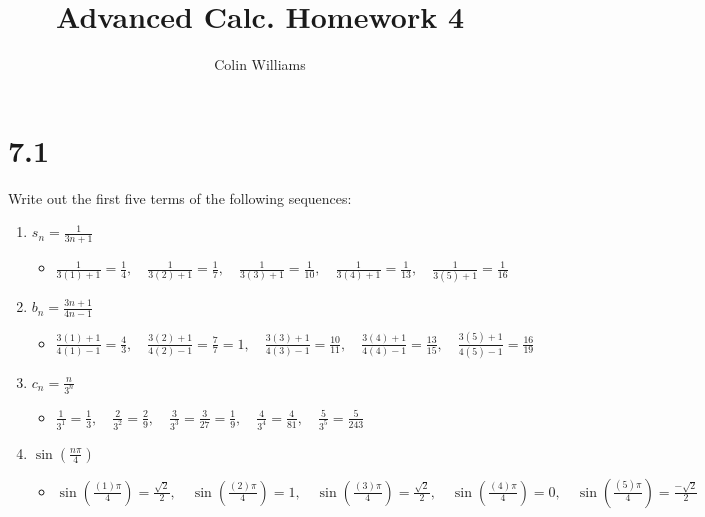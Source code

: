 \documentclass[10pt,a4paper]{article}
\title{Advanced Calc. Homework 4}
\author{Colin Williams}
\theoremstyle{definition}
\begin{document}
\maketitle

\section*{7.1}
Write out the first five terms of the following sequences:
\begin{enumerate}[label = (\alph*)]
\item $\displaystyle s_n = \frac{1}{3n + 1}$
	\begin{itemize}
	\item $\displaystyle \frac{1}{3(1) + 1} = \boxed{\frac{1}{4}}, \quad \frac{1}{3(2) + 1} = \boxed{\frac{1}{7}}, \quad \frac{1}{3(3) + 1} = \boxed{\frac{1}{10}}, \quad \frac{1}{3(4) + 1} = \boxed{\frac{1}{13}}, \quad \frac{1}{3(5) + 1} = \boxed{\frac{1}{16}}$
	\end{itemize}
\item $\displaystyle b_n = \frac{3n + 1}{4n - 1}$
	\begin{itemize}
	\item $\displaystyle \frac{3(1) + 1}{4(1) - 1} = \boxed{\frac{4}{3}}, \quad \frac{3(2) + 1}{4(2) - 1} = \frac{7}{7} = \boxed{1}, \quad \frac{3(3) + 1}{4(3) - 1} = \boxed{\frac{10}{11}}, \quad \frac{3(4) + 1}{4(4) - 1} = \boxed{\frac{13}{15}}, \quad \frac{3(5) + 1}{4(5) - 1} = \boxed{\frac{16}{19}}$
	\end{itemize}
\item $\displaystyle c_n = \frac{n}{3^n}$
	\begin{itemize}
	\item $\displaystyle \frac{1}{3^1} = \boxed{\frac{1}{3}}, \quad \frac{2}{3^2} = \boxed{\frac{2}{9}}, \quad \frac{3}{3^3} = \frac{3}{27} = \boxed{\frac{1}{9}}, \quad \frac{4}{3^4} = \boxed{\frac{4}{81}}, \quad \frac{5}{3^5} = \boxed{\frac{5}{243}}$
	\end{itemize}
\item $\displaystyle \sin\left(\frac{n \pi}{4}\right)$
	\begin{itemize}
	\item $\displaystyle \sin\left(\frac{(1) \pi}{4}\right) = \boxed{\frac{\sqrt{2}}{2}}, \quad \sin\left(\frac{(2) \pi}{4}\right) = \boxed{1}, \quad \sin\left(\frac{(3) \pi}{4}\right) = \boxed{\frac{\sqrt{2}}{2}}, \quad \sin\left(\frac{(4) \pi}{4}\right) = \boxed{0}, \quad \sin\left(\frac{(5) \pi}{4}\right) = \boxed{\frac{-\sqrt{2}}{2}}$
	\end{itemize}
\end{enumerate}
\end{document}
